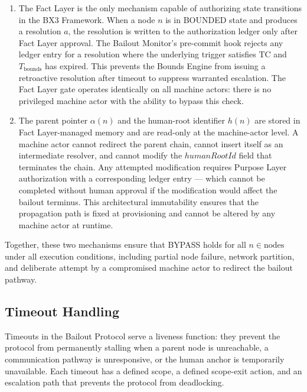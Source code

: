 \begin{enumerate}
\item[\textbf{Fact Layer gate (enforcement at the authorization layer).}] The Fact Layer is the only mechanism capable of authorizing state transitions in the BX3 Framework. When a node $n$ is in BOUNDED state and produces a resolution $a$, the resolution is written to the authorization ledger only after Fact Layer approval. The Bailout Monitor's pre-commit hook rejects any ledger entry for a resolution where the underlying trigger satisfies TC and $T_{\text{bounds}}$ has expired. This prevents the Bounds Engine from issuing a retroactive resolution after timeout to suppress warranted escalation. The Fact Layer gate operates identically on all machine actors: there is no privileged machine actor with the ability to bypass this check.

\item[\textbf{Immutable parent-pointer and human-root architecture (enforcement at the data model layer).}] The parent pointer $\alpha(n)$ and the human-root identifier $h(n)$ are stored in Fact Layer-managed memory and are read-only at the machine-actor level. A machine actor cannot redirect the parent chain, cannot insert itself as an intermediate resolver, and cannot modify the $humanRootId$ field that terminates the chain. Any attempted modification requires Purpose Layer authorization with a corresponding ledger entry — which cannot be completed without human approval if the modification would affect the bailout terminus. This architectural immutability ensures that the propagation path is fixed at provisioning and cannot be altered by any machine actor at runtime.
\end{enumerate}

Together, these two mechanisms ensure that BYPASS holds for all $n \in \text{nodes}$ under all execution conditions, including partial node failure, network partition, and deliberate attempt by a compromised machine actor to redirect the bailout pathway.

\subsection{Timeout Handling}\label{sec:timeout-handling}

Timeouts in the Bailout Protocol serve a liveness function: they prevent the protocol from permanently stalling when a parent node is unreachable, a communication pathway is unresponsive, or the human anchor is temporarily unavailable. Each timeout has a defined scope, a defined scope-exit action, and an escalation path that prevents the protocol from deadlocking.

